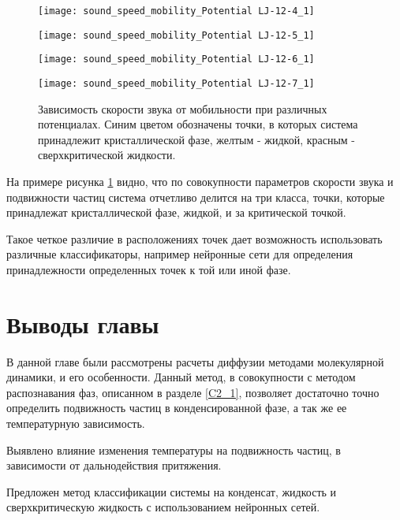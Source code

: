 \begin{figure}[h]
\begin{center}
\begin{minipage}[h]{0.45\linewidth}
\texttt{[image: sound\_speed\_mobility\_Potential LJ-12-4\_1]}
\end{minipage}
\begin{minipage}[h]{0.45\linewidth}
\texttt{[image: sound\_speed\_mobility\_Potential LJ-12-5\_1]}
\end{minipage}

\begin{minipage}[h]{0.45\linewidth}
\texttt{[image: sound\_speed\_mobility\_Potential LJ-12-6\_1]}
\end{minipage}
\begin{minipage}[h]{0.45\linewidth}
\texttt{[image: sound\_speed\_mobility\_Potential LJ-12-7\_1]}
\end{minipage}
\caption{Зависимость скорости звука от мобильности при различных потенциалах. Синим цветом обозначены точки, в которых система принадлежит кристаллической фазе, желтым - жидкой, красным - сверхкритической жидкости.}
\label{risCMu}
\end{center}
\end{figure}

На примере рисунка \ref{risCMu} видно, что по совокупности параметров скорости звука и подвижности частиц система отчетливо делится на три класса, точки, которые принадлежат кристаллической фазе, жидкой, и за критической точкой. 

Такое четкое различие в расположениях точек дает возможность использовать различные классификаторы, например нейронные сети для определения принадлежности определенных точек к той или иной фазе. 


\section{Выводы главы}\label{C3_3}

В данной главе были рассмотрены расчеты диффузии методами молекулярной динамики, и его особенности. Данный метод, в совокупности с методом распознавания фаз, описанном в разделе \ref{C2_1}, позволяет достаточно точно определить подвижность частиц в конденсированной фазе, а так же ее температурную зависимость.

Выявлено влияние изменения температуры на подвижность частиц, в зависимости от дальнодействия притяжения.

Предложен метод классификации системы на конденсат, жидкость и сверхкритическую жидкость с использованием нейронных сетей.
